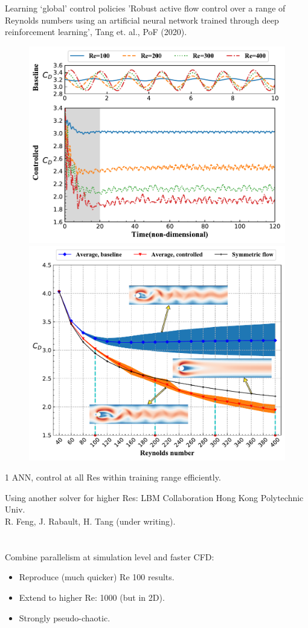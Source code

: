 \documentclass{beamer}
\begin{document}
\begin{frame}{Learning `global' control policies}
  'Robust active flow control over a range of Reynolds numbers using an artificial neural network trained through deep reinforcement learning', Tang et. al., PoF (2020). \\
  
  \begin{figure}
    \begin{center}
      \includegraphics[width=.49\textwidth]{Figures/baseline_Case_109_four_Res}
      \includegraphics[width=.49\textwidth]{Figures/CD_comparison_general_model_Case_109_vorticity}
    \end{center}
    \end{figure}
    
    1 ANN, control at all Res within training range efficiently.
\end{frame}


\begin{frame}{Using another solver for higher Res: LBM}
  Collaboration Hong Kong Polytechnic Univ. \\
  R. Feng, J. Rabault, H. Tang (under writing). \\
  
  \\~\\
  
  Combine parallelism at simulation level and faster CFD:
  \begin{itemize}
    \item Reproduce (much quicker) Re 100 results.
    \item Extend to higher Re: 1000 (but in 2D).
    \item Strongly pseudo-chaotic.
  \end{itemize}
\end{frame}
\end{document}
